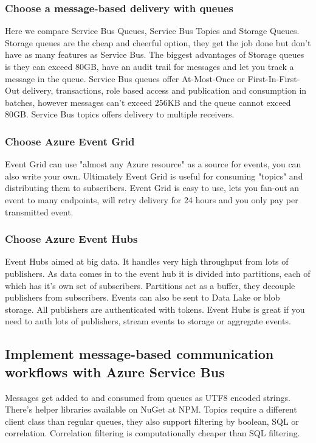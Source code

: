\documentclass{article}
\begin{document}
\subsubsection{Choose a message-based delivery with queues}
Here we compare Service Bus Queues, Service Bus Topics and Storage Queues. Storage queues are the cheap and cheerful option, they get the job done but don't have as many features as Service Bus. The biggest advantages of Storage queues is they can exceed 80GB, have an audit trail for messages and let you track a message in the queue. Service Bus queues offer At-Most-Once or First-In-First-Out delivery, transactions, role based access and publication and consumption in batches, however messages can't exceed 256KB and the queue cannot exceed 80GB. Service Bus topics offers delivery to multiple receivers. 

\subsubsection{Choose Azure Event Grid}
Event Grid can use "almost any Azure resource" as a source for events, you can also write your own. Ultimately Event Grid is useful for consuming "topics" and distributing them to subscribers. Event Grid is easy to use, lets you fan-out an event to many endpoints, will retry delivery for 24 hours and you only pay per transmitted event.

\subsubsection{Choose Azure Event Hubs}
Event Hubs aimed at big data. It handles very high throughput from lots of publishers. As data comes in to the event hub it is divided into partitions, each of which has it's own set of subscribers. Partitions act as a buffer, they decouple publishers from subscribers. Events can also be sent to Data Lake or blob storage. All publishers are authenticated with tokens. Event Hubs is great if you need to auth lots of publishers, stream events to storage or aggregate events.

\subsection{Implement message-based communication workflows with Azure Service Bus}
Messages get added to and consumed from queues as UTF8 encoded strings. There's helper libraries available on NuGet at NPM. Topics require a different client class than regular queues, they also support filtering by boolean, SQL or correlation. Correlation filtering is computationally cheaper than SQL filtering.
\end{document}

